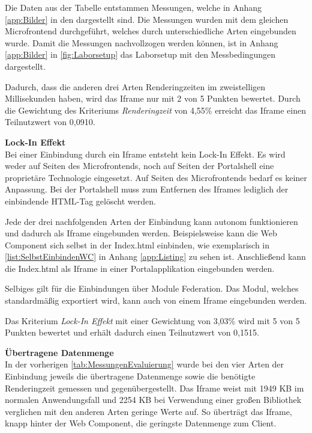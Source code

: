 Die Daten aus der Tabelle entstammen Messungen, welche in Anhang \ref{app:Bilder} in den  dargestellt sind. Die Messungen wurden mit dem gleichen Microfrontend durchgeführt, welches durch unterschiedliche Arten eingebunden wurde. Damit die Messungen nachvollzogen werden können, ist in Anhang \ref{app:Bilder} in \cref{fig:Laborsetup} das Laborsetup mit den Messbedingungen dargestellt.

Dadurch, dass die anderen drei Arten Renderingzeiten im zweistelligen Millisekunden haben, wird das Iframe nur mit 2 von 5 Punkten bewertet. Durch die Gewichtung des Kriteriums \textit{Renderingzeit} von 4,55\% erreicht das Iframe einen Teilnutzwert von 0,0910.

\textbf{Lock-In Effekt}\\
Bei einer Einbindung durch ein Iframe entsteht kein Lock-In Effekt. Es wird weder auf Seiten des Microfrontends, noch auf Seiten der Portalshell eine proprietäre Technologie eingesetzt. Auf Seiten des Microfrontends bedarf es keiner Anpassung. Bei der Portalshell muss zum Entfernen des Iframes lediglich der einbindende HTML-Tag gelöscht werden.

Jede der drei nachfolgenden Arten der Einbindung kann autonom funktionieren und dadurch als Iframe eingebunden werden. Beispielsweise kann die Web Component sich selbst in der Index.html einbinden, wie exemplarisch in \cref{list:SelbstEinbindenWC} in Anhang \ref{app:Listing} zu sehen ist. Anschließend kann die Index.html als Iframe in einer Portalapplikation eingebunden werden.

Selbiges gilt für die Einbindungen über Module Federation. Das Modul, welches standardmäßig exportiert wird, kann auch von einem Iframe eingebunden werden.

Das Kriterium \textit{Lock-In Effekt} mit einer Gewichtung von 3,03\% wird mit 5 von 5 Punkten bewertet und erhält dadurch einen Teilnutzwert von 0,1515.

\textbf{Übertragene Datenmenge}\\
In der vorherigen \cref{tab:MessungenEvaluierung} wurde bei den vier Arten der Einbindung jeweils die übertragene Datenmenge sowie die benötigte Renderingzeit gemessen und gegenübergestellt. Das Iframe weist mit 1949 \gls{KB} im normalen Anwendungsfall und 2254 \gls{KB} bei Verwendung einer großen Bibliothek verglichen mit den anderen Arten geringe Werte auf. So überträgt das Iframe, knapp hinter der Web Component, die geringste Datenmenge zum Client.

